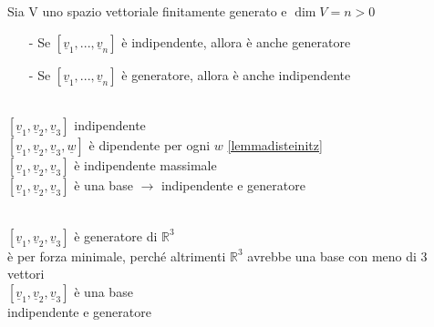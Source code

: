 \begin{lemma}\label{conselemmadisteinitz}
	Sia V uno spazio vettoriale finitamente generato e $\dim V=n>0$\\
	\begin{itemize}
		\item[-] Se $[\underline{v}_1,...,\underline{v}_n]$ è indipendente, allora è anche generatore
		\item[-] Se $[\underline{v}_1,...,\underline{v}_n]$ è generatore, allora è anche indipendente
	\end{itemize}
	\begin{dimostrazione}[INDIP=GEN]
		\phantom{}\\
		$[\underline{v}_1,\underline{v}_2,\underline{v}_3]$ indipendente\\
		$[\underline{v}_1,\underline{v}_2,\underline{v}_3,\underline{w}]$ è dipendente per ogni $w$ \ref{lemmadisteinitz}\\
		$[\underline{v}_1,\underline{v}_2,\underline{v}_3]$ è indipendente massimale\\
		$[\underline{v}_1,\underline{v}_2,\underline{v}_3]$ è una base $\longrightarrow$ indipendente e generatore
	\end{dimostrazione}
	\begin{dimostrazione}[GEN=INDIP]
		\phantom{}\\
		$[\underline{v}_1,\underline{v}_2,\underline{v}_3]$ è generatore di $\mathbb{R}^3$\\
		è per forza minimale, perché altrimenti $\mathbb{R}^3$ avrebbe una base con meno di 3 vettori\\
		$[\underline{v}_1,\underline{v}_2,\underline{v}_3]$ è una base\\
		indipendente e generatore
	\end{dimostrazione}
\end{lemma}

